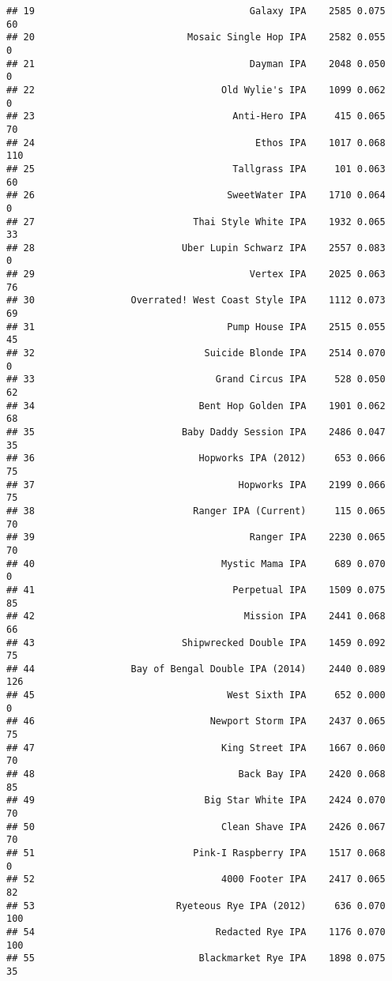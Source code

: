 \documentclass[
]{article}
\begin{document}
\begin{verbatim}
## 19                                      Galaxy IPA    2585 0.075  60
## 20                           Mosaic Single Hop IPA    2582 0.055   0
## 21                                      Dayman IPA    2048 0.050   0
## 22                                 Old Wylie's IPA    1099 0.062   0
## 23                                   Anti-Hero IPA     415 0.065  70
## 24                                       Ethos IPA    1017 0.068 110
## 25                                   Tallgrass IPA     101 0.063  60
## 26                                  SweetWater IPA    1710 0.064   0
## 27                            Thai Style White IPA    1932 0.065  33
## 28                          Uber Lupin Schwarz IPA    2557 0.083   0
## 29                                      Vertex IPA    2025 0.063  76
## 30                 Overrated! West Coast Style IPA    1112 0.073  69
## 31                                  Pump House IPA    2515 0.055  45
## 32                              Suicide Blonde IPA    2514 0.070   0
## 33                                Grand Circus IPA     528 0.050  62
## 34                             Bent Hop Golden IPA    1901 0.062  68
## 35                          Baby Daddy Session IPA    2486 0.047  35
## 36                             Hopworks IPA (2012)     653 0.066  75
## 37                                    Hopworks IPA    2199 0.066  75
## 38                            Ranger IPA (Current)     115 0.065  70
## 39                                      Ranger IPA    2230 0.065  70
## 40                                 Mystic Mama IPA     689 0.070   0
## 41                                   Perpetual IPA    1509 0.075  85
## 42                                     Mission IPA    2441 0.068  66
## 43                          Shipwrecked Double IPA    1459 0.092  75
## 44                 Bay of Bengal Double IPA (2014)    2440 0.089 126
## 45                                  West Sixth IPA     652 0.000   0
## 46                               Newport Storm IPA    2437 0.065  75
## 47                                 King Street IPA    1667 0.060  70
## 48                                    Back Bay IPA    2420 0.068  85
## 49                              Big Star White IPA    2424 0.070  70
## 50                                 Clean Shave IPA    2426 0.067  70
## 51                            Pink-I Raspberry IPA    1517 0.068   0
## 52                                 4000 Footer IPA    2417 0.065  82
## 53                         Ryeteous Rye IPA (2012)     636 0.070 100
## 54                                Redacted Rye IPA    1176 0.070 100
## 55                             Blackmarket Rye IPA    1898 0.075  35

\end{verbatim}
\end{document}
